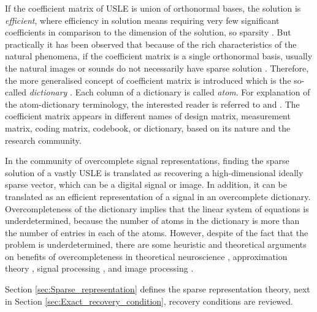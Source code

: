 If the coefficient matrix of USLE is union of orthonormal bases, 
the solution is 
\emph{efficient}, 
where 
efficiency 
in solution means requiring very few significant coefficients in comparison to the dimension of the solution, so sparsity \cite{Chen2001,Gribonval2003a}.
But practically it has been observed that because of the rich characteristics of the natural phenomena, if the coefficient matrix is a single orthonormal basis, usually the natural images or sounds do not necessarily have sparse solution \cite{Gribonval2003}. 
Therefore, the more generalised concept of coefficient matrix is introduced which is the so-called \emph{dictionary} \cite{Mallat1993}. Each column of a dictionary is called \emph{atom}. 
For explanation of the atom-dictionary terminology, the interested reader is referred to \cite{Mallat1993} and \cite{Chen2001}.
The coefficient matrix appears in different names of design matrix, measurement matrix, coding matrix, codebook, 
or dictionary, based on its nature and the research community.

In the community of overcomplete signal representations, finding the sparse solution of a vastly USLE is translated as 
recovering a high-dimensional ideally sparse 
vector, which can be a digital signal 
or image. 
In addition, it can be translated as an 
efficient representation of a signal in an overcomplete dictionary. 
Overcompleteness of the dictionary implies that the linear system of equations is underdetermined, because the number of atoms in the dictionary is more than the number of entries in each of the atoms.
However, despite of the fact that the problem is underdetermined, there are some heuristic and theoretical arguments on benefits of overcompleteness in theoretical neuroscience \cite{Olshausen1997}, approximation theory \cite{Cand`es2002}, signal processing \cite{DeBrunner1997,Berg1999,Cotter2002}, and image processing \cite{Huo1999,Starck2002,Starck2003}.

Section \ref{sec:Sparse_representation} defines the sparse representation theory, next in Section \ref{sec:Exact_recovery_condition}, recovery conditions are reviewed.